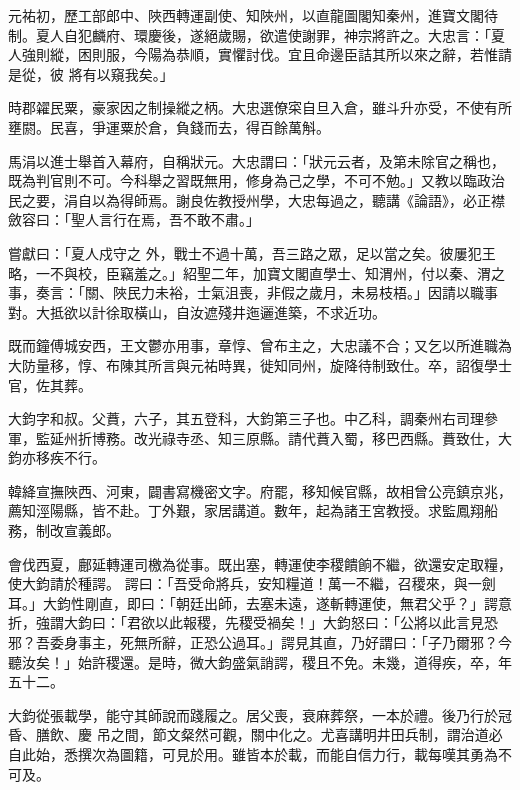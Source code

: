 \begin{pinyinscope}
 元祐初，歷工部郎中、陜西轉運副使、知陜州，以直龍圖閣知秦州，進寶文閣待制。夏人自犯麟府、環慶後，遂絕歲賜，欲遣使謝罪，神宗將許之。大忠言：「夏人強則縱，困則服，今陽為恭順，實懼討伐。宜且命邊臣詰其所以來之辭，若惟請是從，彼
 將有以窺我矣。」



 時郡糴民粟，豪家因之制操縱之柄。大忠選僚寀自旦入倉，雖斗升亦受，不使有所壅閼。民喜，爭運粟於倉，負錢而去，得百餘萬斛。



 馬涓以進士舉首入幕府，自稱狀元。大忠謂曰：「狀元云者，及第未除官之稱也，既為判官則不可。今科舉之習既無用，修身為己之學，不可不勉。」又教以臨政治民之要，涓自以為得師焉。謝良佐教授州學，大忠每過之，聽講《論語》，必正襟斂容曰：「聖人言行在焉，吾不敢不肅。」



 嘗獻曰：「夏人戍守之
 外，戰士不過十萬，吾三路之眾，足以當之矣。彼屢犯王略，一不與校，臣竊羞之。」紹聖二年，加寶文閣直學士、知渭州，付以秦、渭之事，奏言：「關、陜民力未裕，士氣沮喪，非假之歲月，未易枝梧。」因請以職事對。大抵欲以計徐取橫山，自汝遮殘井迤邐進築，不求近功。



 既而鐘傅城安西，王文鬱亦用事，章惇、曾布主之，大忠議不合；又乞以所進職為大防量移，惇、布陳其所言與元祐時異，徙知同州，旋降待制致仕。卒，詔復學士官，佐其葬。



 大鈞字和叔。父蕡，六子，其五登科，大鈞第三子也。中乙科，調秦州右司理參軍，監延州折博務。改光祿寺丞、知三原縣。請代蕡入蜀，移巴西縣。蕡致仕，大鈞亦移疾不行。



 韓絳宣撫陜西、河東，闢書寫機密文字。府罷，移知候官縣，故相曾公亮鎮京兆，薦知涇陽縣，皆不赴。丁外艱，家居講道。數年，起為諸王宮教授。求監鳳翔船務，制改宣義郎。



 會伐西夏，鄜延轉運司檄為從事。既出塞，轉運使李稷饋餉不繼，欲還安定取糧，使大鈞請於種諤。
 諤曰：「吾受命將兵，安知糧道！萬一不繼，召稷來，與一劍耳。」大鈞性剛直，即曰：「朝廷出師，去塞未遠，遂斬轉運使，無君父乎？」諤意折，強謂大鈞曰：「君欲以此報稷，先稷受禍矣！」大鈞怒曰：「公將以此言見恐邪？吾委身事主，死無所辭，正恐公過耳。」諤見其直，乃好謂曰：「子乃爾邪？今聽汝矣！」始許稷還。是時，微大鈞盛氣誚諤，稷且不免。未幾，道得疾，卒，年五十二。



 大鈞從張載學，能守其師說而踐履之。居父喪，衰麻葬祭，一本於禮。後乃行於冠昏、膳飲、慶
 吊之間，節文粲然可觀，關中化之。尤喜講明井田兵制，謂治道必自此始，悉撰次為圖籍，可見於用。雖皆本於載，而能自信力行，載每嘆其勇為不可及。




\end{pinyinscope}
